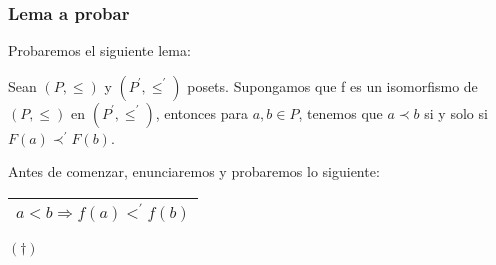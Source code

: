 \begin{frame}
	\frametitle{Lema a probar}

	\PN Probaremos el siguiente lema:

	\vspace{3mm}
	\begin{lemma}{}
		\PN Sean $(P, \leq)$ y $(P^{\prime}, \leq^{\prime})$ posets. Supongamos que f es un isomorfismo de $(P, \leq)$ en
		$(P^{\prime}, \leq^{\prime})$, entonces para $a, b \in P$, tenemos que $a \prec b$ si y solo si $F(a) \prec^{\prime}
		F(b)$.
	\end{lemma}

	\vspace{7mm}
	\PN Antes de comenzar, enunciaremos y probaremos lo siguiente:
	\begin{center}
		\begin{tabular}{|c|} \hline $a < b \Rightarrow f(a) <^{\prime} f(b)$ \\\hline \end{tabular} $(\dag)$
	\end{center}

\end{frame}

